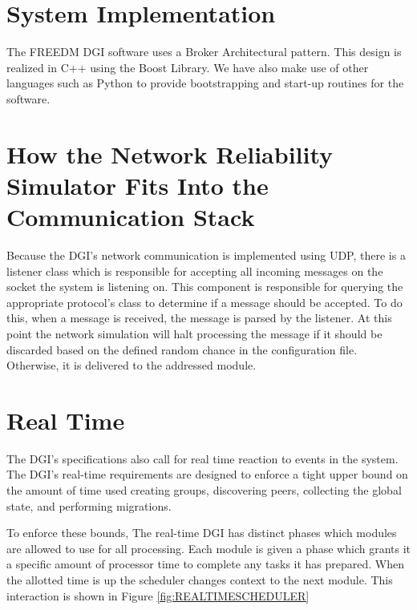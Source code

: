 \section{System Implementation}

The FREEDM DGI software uses a Broker Architectural pattern. This design is 
realized in C++ using the Boost Library\cite{BOOST}. We have also make use of 
other languages such as Python to provide bootstrapping and start-up routines 
for the software.

\section{How the Network Reliability Simulator Fits Into the Communication 
Stack}

Because the DGI's network communication is implemented using UDP, there is a 
listener class which is responsible for accepting all incoming messages on the 
socket the system is listening on. This component is responsible for querying 
the appropriate protocol's class to determine
if a message should be accepted. To do this, when a message is received, the 
message is parsed by the listener. At this point the network simulation will 
halt processing the  message if it should be discarded based on the defined 
random chance in the configuration file. Otherwise, it is delivered to the 
addressed module.

\section{Real Time}
The DGI's specifications also call for real time reaction to events in the
system. The DGI's real-time requirements are designed to enforce a tight
upper bound on the amount of time used creating groups, discovering peers,
collecting the global state, and performing migrations.

To enforce these bounds, The real-time DGI has distinct phases which modules
are allowed to use for all processing. Each module is given a phase which
grants it a specific amount of processor time to complete any tasks it has
prepared. When the allotted time is up the scheduler changes context to the
next module. This interaction is shown in Figure \ref{fig:REALTIMESCHEDULER}

